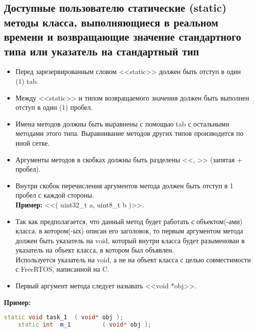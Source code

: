 \subsection{Доступные пользователю статические (static) методы класса, выполняющиеся в реальном времени и возвращающие значение стандартного типа или указатель на стандартный тип}\label{dp:s:s}	\begin{itemize}
	\item Перед зарезервированным словом <<static>> должен быть отступ в один (1) tab.
	\item Между <<static>> и типом возвращаемого значения должен быть выполнен отступ в один (1) пробел.
	\item Имена методов должны быть выравнены с помощью tab с остальными методами этого типа. Выравнивание методов других типов производится по иной сетке.
	\item Аргументы методов в скобках должны быть разделены <<, >> (запятая + пробел).
	\item Внутри скобок перечисления аргументов метода должен быть отступ в 1 пробел с каждой стороны.\\\textbf{Пример: } <<( uint32\_t a, uint8\_t b )>>.
	\item Так как предполагается, что данный метод будет работать с объектом(-ами) класса, в котором(-ых) описан его заголовок, то первым аргументом метода должен быть указатель на void, который внутри класса будет разыменован в указатель на объект класса, в котором был объявлен.\\Используется указатель на void, а не на объект класса с целью совместимости с FreeRTOS, написанной на C.
	\item Первый аргумент метода следует называть <<void *obj>>.
\end{itemize}
\textbf{Пример:}\begin{lstlisting}[language=C++, frame=tlBR, basicstyle=\fontsize{10}{10}\ttfamily]
	static void	task_1	( void* obj );
	static int	m_1			( void* obj );
\end{lstlisting}

